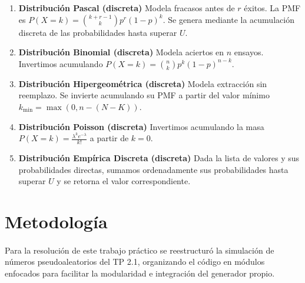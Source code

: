 \documentclass{article}
\begin{document}
\begin{enumerate}
    \item \textbf{Distribución Pascal (discreta)}
    Modela fracasos antes de $r$ éxitos. La PMF es $P(X = k) = \binom{k+r-1}{k} p^r (1-p)^k$. Se genera mediante la acumulación discreta de las probabilidades hasta superar $U$.

    \item \textbf{Distribución Binomial (discreta)}
    Modela aciertos en $n$ ensayos. Invertimos acumulando $P(X = k) = \binom{n}{k} p^k (1-p)^{n-k}$.

    \item \textbf{Distribución Hipergeométrica (discreta)}
    Modela extracción sin reemplazo. Se invierte acumulando su PMF a partir del valor mínimo $k_{\min} = \max(0, n - (N - K))$.

    \item \textbf{Distribución Poisson (discreta)}
    Invertimos acumulando la masa $P(X = k) = \frac{\lambda^k e^{-\lambda}}{k!}$ a partir de $k = 0$.

    \item \textbf{Distribución Empírica Discreta (discreta)}
    Dada la lista de valores y sus probabilidades directas, sumamos ordenadamente sus probabilidades hasta superar $U$ y se retorna el valor correspondiente.
\end{enumerate}

\newpage
\section{Metodología}
\paragraph{}
Para la resolución de este trabajo práctico se reestructuró la simulación de números pseudoaleatorios del TP 2.1, organizando el código en módulos enfocados para facilitar la modularidad e integración del generador propio.
\end{document}
